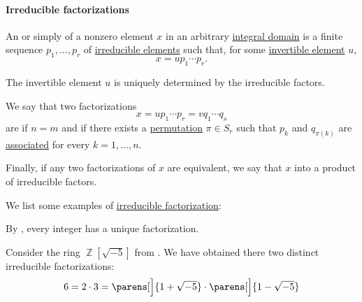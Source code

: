 \paragraph{Irreducible factorizations}

\begin{definition}\label{def:irreducible_factorization}
  An  or simply  of a nonzero element \( x \) in an arbitrary \hyperref[def:integral_domain]{integral domain} is a finite sequence \( p_1, \ldots, p_r \) of \hyperref[def:domain_divisibility/irreducible]{irreducible elements} such that, for some \hyperref[def:divisibility/invertible]{invertible element} \( u \),
  \begin{equation*}
    x = u p_1 \cdots p_r.
  \end{equation*}

  The invertible element \( u \) is uniquely determined by the irreducible factors.

  \begin{thmenum}
     We say that two factorizations
    \begin{equation*}
      x = u p_1 \cdots p_r = v q_1 \cdots q_s
    \end{equation*}
    are  if \( n = m \) and if there exists a \hyperref[def:symmetric_group]{permutation} \( \pi \in S_r \) such that \( p_k \) and \( q_{\pi(k)} \) are \hyperref[def:domain_divisibility/associates]{associated} for every \( k = 1, \ldots, n \).

     Finally, if any two factorizations of \( x \) are equivalent, we say that \( x \)  into a product of irreducible factors.
  \end{thmenum}
\end{definition}

\begin{example}\label{ex:def:irreducible_factorization}
  We list some examples of \hyperref[def:irreducible_factorization]{irreducible factorization}:
  \begin{thmenum}
     By , every integer has a unique factorization.

     Consider the ring \( \BbbZ[\sqrt{-5}] \) from . We have obtained there two distinct irreducible factorizations:
    \begin{equation*}
      6 = 2 \cdot 3 = \parens[\Big]{ 1 + \sqrt{-5} } \cdot \parens[\Big]{ 1 - \sqrt{-5}}
    \end{equation*}
  \end{thmenum}
\end{example}

